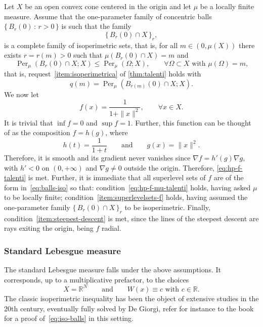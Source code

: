 \documentclass[a4paper,12pt,reqno]{amsart}
\numberwithin{equation}{section}
\DeclareMathOperator{\Per}{Per}
\theoremstyle{plain}
\theoremstyle{definition}
\begin{document}
Let $X$ be an open convex cone centered in the origin and let $\mu$ be a locally finite measure. Assume that the one-para\-met\-er family of concentric balls $\{\,B_r(0)\,:\,r>0\,\}$ is such that the family
%
\begin{equation}
\label{eq:balls-iso}
\{\,B_r(0) \cap X\,\}_r,
\end{equation}
%
is a complete family of isoperimetric sets, that is, for all $m\in(0,\mu(X))$ there exists $r=r(m)>0$ such that $\mu(B_r(0)\cap X)=m$ and
%
\begin{equation}
\label{eq:iso-balls}
\Per_\mu (B_r(0)\cap X; X) \le \Per_\mu(\Omega; X),
\qquad \forall \Omega\subset X
\text{ with $\mu(\Omega)=m$,}
\end{equation}
%
that is, request~\ref{item:isoperimetrica} of \cref{thm:talenti} holds with
%
\[
q(m) = \Per_\mu(B_{r(m)}(0)\cap X; X).
\]
%
We now let
%
\[
f(x) = \frac{1}{1+\|x\|^2}, \qquad \forall x\in X.
\]
%
It is trivial that $\inf f = 0$ and $\sup f = 1$. Further, this function can be thought of as the composition $f = h(g)$, where
%
\[
h(t) = \frac{1}{1+t}
\qquad\text{and}\qquad 
g(x)=\|x\|^2.
\]
%
Therefore, it is smooth and its gradient never vanishes since $\nabla f = h'(g)\nabla g$, with $h'<0$ on $(0,+\infty)$ and $\nabla g \neq 0$ outside the origin. Therefore, \eqref{eq:hp-f-talenti} is met.
%
Further, it is immediate that all superlevel sets of $f$ are of the form in~\eqref{eq:balls-iso} so that: condition~\eqref{eq:hp-f-mu-talenti} holds, having asked $\mu$ to be locally finite; condition~\ref{item:superlevelsets-f} holds, having assumed the one-parameter family $\{\,B_r(0) \cap X\,\}_r$ to be isoperimetric.
%
Finally, condition~\ref{item:steepest-descent} is met, since the lines of the steepest descent are rays exiting the origin, being $f$ radial.

\subsubsection{Standard Lebesgue measure}
\label{sec:euclidean}

The standard Lebesgue measure falls under the above assumptions. It corresponds, up to a multiplicative prefactor, to the choices
%
\[
X=\mathbb{R}^N 
\qquad\text{and}\qquad
W(x)\equiv c \text{ with } c\in\mathbb{R}.
\]
%
The classic isoperimetric inequality has been the object of extensive studies in the 20th century, eventually fully solved by De Giorgi, refer for instance to the book~\cite{Mag12book} for a proof of~\eqref{eq:iso-balls} in this setting.
%
\end{document}
